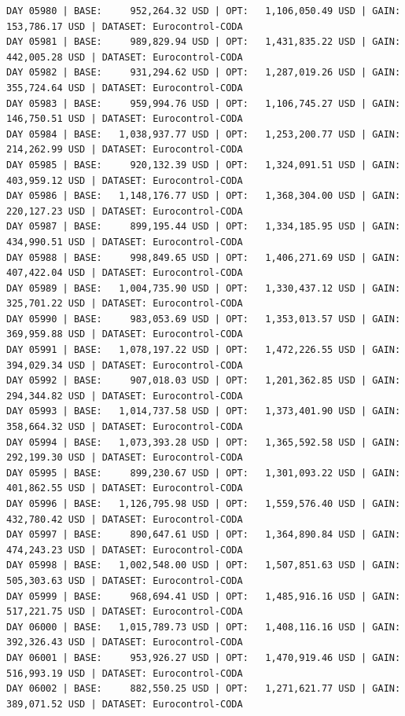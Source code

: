 \documentclass[11pt,a4paper]{article}
\begin{document}
\begin{verbatim}
DAY 05980 | BASE:     952,264.32 USD | OPT:   1,106,050.49 USD | GAIN: 153,786.17 USD | DATASET: Eurocontrol-CODA
DAY 05981 | BASE:     989,829.94 USD | OPT:   1,431,835.22 USD | GAIN: 442,005.28 USD | DATASET: Eurocontrol-CODA
DAY 05982 | BASE:     931,294.62 USD | OPT:   1,287,019.26 USD | GAIN: 355,724.64 USD | DATASET: Eurocontrol-CODA
DAY 05983 | BASE:     959,994.76 USD | OPT:   1,106,745.27 USD | GAIN: 146,750.51 USD | DATASET: Eurocontrol-CODA
DAY 05984 | BASE:   1,038,937.77 USD | OPT:   1,253,200.77 USD | GAIN: 214,262.99 USD | DATASET: Eurocontrol-CODA
DAY 05985 | BASE:     920,132.39 USD | OPT:   1,324,091.51 USD | GAIN: 403,959.12 USD | DATASET: Eurocontrol-CODA
DAY 05986 | BASE:   1,148,176.77 USD | OPT:   1,368,304.00 USD | GAIN: 220,127.23 USD | DATASET: Eurocontrol-CODA
DAY 05987 | BASE:     899,195.44 USD | OPT:   1,334,185.95 USD | GAIN: 434,990.51 USD | DATASET: Eurocontrol-CODA
DAY 05988 | BASE:     998,849.65 USD | OPT:   1,406,271.69 USD | GAIN: 407,422.04 USD | DATASET: Eurocontrol-CODA
DAY 05989 | BASE:   1,004,735.90 USD | OPT:   1,330,437.12 USD | GAIN: 325,701.22 USD | DATASET: Eurocontrol-CODA
DAY 05990 | BASE:     983,053.69 USD | OPT:   1,353,013.57 USD | GAIN: 369,959.88 USD | DATASET: Eurocontrol-CODA
DAY 05991 | BASE:   1,078,197.22 USD | OPT:   1,472,226.55 USD | GAIN: 394,029.34 USD | DATASET: Eurocontrol-CODA
DAY 05992 | BASE:     907,018.03 USD | OPT:   1,201,362.85 USD | GAIN: 294,344.82 USD | DATASET: Eurocontrol-CODA
DAY 05993 | BASE:   1,014,737.58 USD | OPT:   1,373,401.90 USD | GAIN: 358,664.32 USD | DATASET: Eurocontrol-CODA
DAY 05994 | BASE:   1,073,393.28 USD | OPT:   1,365,592.58 USD | GAIN: 292,199.30 USD | DATASET: Eurocontrol-CODA
DAY 05995 | BASE:     899,230.67 USD | OPT:   1,301,093.22 USD | GAIN: 401,862.55 USD | DATASET: Eurocontrol-CODA
DAY 05996 | BASE:   1,126,795.98 USD | OPT:   1,559,576.40 USD | GAIN: 432,780.42 USD | DATASET: Eurocontrol-CODA
DAY 05997 | BASE:     890,647.61 USD | OPT:   1,364,890.84 USD | GAIN: 474,243.23 USD | DATASET: Eurocontrol-CODA
DAY 05998 | BASE:   1,002,548.00 USD | OPT:   1,507,851.63 USD | GAIN: 505,303.63 USD | DATASET: Eurocontrol-CODA
DAY 05999 | BASE:     968,694.41 USD | OPT:   1,485,916.16 USD | GAIN: 517,221.75 USD | DATASET: Eurocontrol-CODA
DAY 06000 | BASE:   1,015,789.73 USD | OPT:   1,408,116.16 USD | GAIN: 392,326.43 USD | DATASET: Eurocontrol-CODA
DAY 06001 | BASE:     953,926.27 USD | OPT:   1,470,919.46 USD | GAIN: 516,993.19 USD | DATASET: Eurocontrol-CODA
DAY 06002 | BASE:     882,550.25 USD | OPT:   1,271,621.77 USD | GAIN: 389,071.52 USD | DATASET: Eurocontrol-CODA

\end{verbatim}
\end{document}
